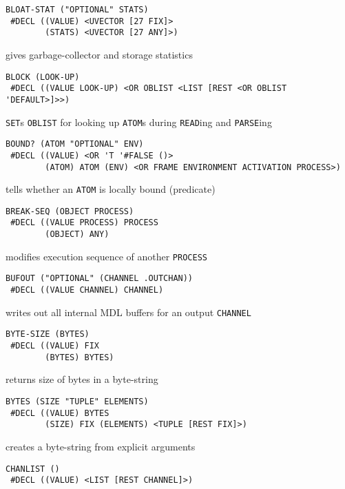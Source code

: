\documentclass[a4paper,]{article}
\begin{document}
\begin{verbatim}
BLOAT-STAT ("OPTIONAL" STATS)
 #DECL ((VALUE) <UVECTOR [27 FIX]>
        (STATS) <UVECTOR [27 ANY]>)
\end{verbatim}

gives garbage-collector and storage statistics

\begin{verbatim}
BLOCK (LOOK-UP)
 #DECL ((VALUE LOOK-UP) <OR OBLIST <LIST [REST <OR OBLIST 'DEFAULT>]>>)
\end{verbatim}

\texttt{SET}s \texttt{OBLIST} for looking up \texttt{ATOM}s during \texttt{READ}ing and \texttt{PARSE}ing

\begin{verbatim}
BOUND? (ATOM "OPTIONAL" ENV)
 #DECL ((VALUE) <OR 'T '#FALSE ()>
        (ATOM) ATOM (ENV) <OR FRAME ENVIRONMENT ACTIVATION PROCESS>)
\end{verbatim}

tells whether an \texttt{ATOM} is locally bound (predicate)

\begin{verbatim}
BREAK-SEQ (OBJECT PROCESS)
 #DECL ((VALUE PROCESS) PROCESS
        (OBJECT) ANY)
\end{verbatim}

modifies execution sequence of another \texttt{PROCESS}

\begin{verbatim}
BUFOUT ("OPTIONAL" (CHANNEL .OUTCHAN))
 #DECL ((VALUE CHANNEL) CHANNEL)
\end{verbatim}

writes out all internal MDL buffers for an output \texttt{CHANNEL}

\begin{verbatim}
BYTE-SIZE (BYTES)
 #DECL ((VALUE) FIX
        (BYTES) BYTES)
\end{verbatim}

returns size of bytes in a byte-string

\begin{verbatim}
BYTES (SIZE "TUPLE" ELEMENTS)
 #DECL ((VALUE) BYTES
        (SIZE) FIX (ELEMENTS) <TUPLE [REST FIX]>)
\end{verbatim}

creates a byte-string from explicit arguments

\begin{verbatim}
CHANLIST ()
 #DECL ((VALUE) <LIST [REST CHANNEL]>)
\end{verbatim}
\end{document}
